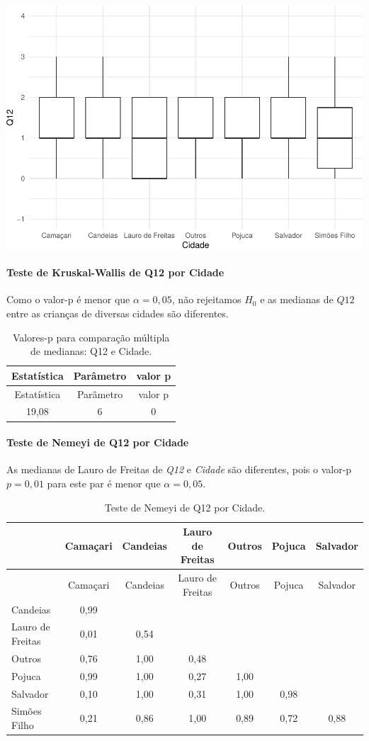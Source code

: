 \documentclass[]{article}
\let\oldparagraph\paragraph
\renewcommand{\paragraph}[1]{\oldparagraph{#1}\mbox{}}
\begin{document}
\begin{center}\includegraphics[width=0.75\linewidth]{relatorio_files/figure-latex/unnamed-chunk-21-1} \end{center}

\hypertarget{teste-de-kruskal-wallis-de-q12-por-cidade}{%
\paragraph{Teste de Kruskal-Wallis de Q12 por Cidade}\label{teste-de-kruskal-wallis-de-q12-por-cidade}}

Como o valor-p é menor que \(\alpha=0,05\), não rejeitamos \(H_0\) e as medianas de \(Q12\) entre as crianças de diversas cidades são diferentes.

\begin{longtable}[]{@{}ccc@{}}
\caption{\label{tab:unnamed-chunk-22}Valores-p para comparação múltipla de medianas: Q12 e Cidade.}\tabularnewline
\toprule
Estatística & Parâmetro & valor p\tabularnewline
\midrule
\endfirsthead
\toprule
Estatística & Parâmetro & valor p\tabularnewline
\midrule
\endhead
19,08 & 6 & 0\tabularnewline
\bottomrule
\end{longtable}

\hypertarget{teste-de-nemeyi-de-q12-por-cidade}{%
\paragraph{Teste de Nemeyi de Q12 por Cidade}\label{teste-de-nemeyi-de-q12-por-cidade}}

As medianas de Lauro de Freitas de \emph{Q12} e \emph{Cidade} são diferentes, pois o valor-p \(p = 0,01\) para este par é menor que \(\alpha = 0,05\).

\begin{longtable}[]{@{}lcccccc@{}}
\caption{\label{tab:unnamed-chunk-23}Teste de Nemeyi de Q12 por Cidade.}\tabularnewline
\toprule
& Camaçari & Candeias & Lauro de Freitas & Outros & Pojuca & Salvador\tabularnewline
\midrule
\endfirsthead
\toprule
& Camaçari & Candeias & Lauro de Freitas & Outros & Pojuca & Salvador\tabularnewline
\midrule
\endhead
Candeias & 0,99 & & & & &\tabularnewline
Lauro de Freitas & 0,01 & 0,54 & & & &\tabularnewline
Outros & 0,76 & 1,00 & 0,48 & & &\tabularnewline
Pojuca & 0,99 & 1,00 & 0,27 & 1,00 & &\tabularnewline
Salvador & 0,10 & 1,00 & 0,31 & 1,00 & 0,98 &\tabularnewline
Simões Filho & 0,21 & 0,86 & 1,00 & 0,89 & 0,72 & 0,88\tabularnewline
\bottomrule
\end{longtable}
\end{document}

